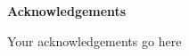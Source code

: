{\noindent\fontsize{14}{21}\selectfont\textbf{Acknowledgements}}

\vspace{0.8cm}

Your acknowledgements go here